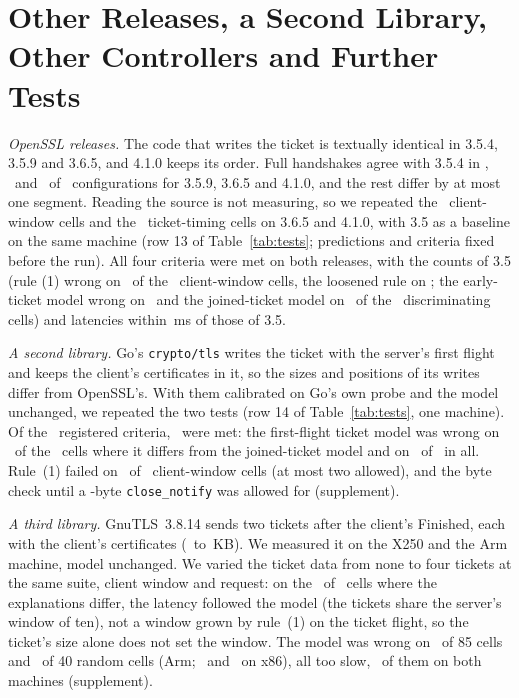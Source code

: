 \documentclass[sigconf,9pt,nonacm]{acmart}
\newcommand{\ms}{\,ms\xspace}
\begin{document}
\section{Other Releases, a Second Library, Other Controllers and Further Tests}\label{sec:other}
\emph{OpenSSL releases.} The code that writes the ticket is textually identical in 3.5.4, 3.5.9 and 3.6.5, and 4.1.0 keeps its order. Full handshakes agree with 3.5.4 in \OvTwoSame, \OvThreeSame\ and \OvFourSame\ of \OvTwoAll\ configurations for 3.5.9, 3.6.5 and 4.1.0, and the rest differ by at most one segment. Reading the source is not measuring, so we repeated the \CN\ client-window cells and the \DN\ ticket-timing cells on 3.6.5 and 4.1.0, with 3.5 as a baseline on the same machine (row 13 of Table~\ref{tab:tests}; predictions and criteria fixed before the run). All four criteria were met on both releases, with the counts of 3.5 (rule (1) wrong on \GxFourCWrong\ of the \CN\ client-window cells, the loosened rule on \GxFourCLoose; the early-ticket model wrong on \GxFourDisEarly\ and the joined-ticket model on \GxFourDisJoined\ of the \DDiff\ discriminating cells) and latencies within \GxMaxDiff\ms of those of 3.5.

\emph{A second library.} Go's \texttt{crypto/tls} writes the ticket with the server's first flight and keeps the client's certificates in it, so the sizes and positions of its writes differ from OpenSSL's. With them calibrated on Go's own probe and the model unchanged, we repeated the two tests (row 14 of Table~\ref{tab:tests}, one machine). Of the \GoKW\ registered criteria, \GoMet\ were met: the first-flight ticket model was wrong on \GoDisGoWrong\ of the \GoDisN\ cells where it differs from the joined-ticket model and on \GoWrongAll\ of \GoDN\ in all. Rule~(1) failed on \GoCWrong\ of \GoCN\ client-window cells (at most two allowed), and the byte check until a \GoClose-byte \texttt{close\_notify} was allowed for (supplement).

\emph{A third library.} GnuTLS~3.8.14 sends two tickets after the client's Finished, each with the client's certificates (\GtlsTicketMinKB\ to \GtlsTicketMaxKB\,KB). We measured it on the X250 and the Arm machine, model unchanged. We varied the ticket data from none to four tickets at the same suite, client window and request: on the \GtlsATInflight\ of \GtlsATN\ cells where the explanations differ, the latency followed the model (the tickets share the server's window of ten), not a window grown by rule~(1) on the ticket flight, so the ticket's size alone does not set the window. The model was wrong on \GtlsADWrong\ of 85 cells and \GtlsARWrong\ of 40 random cells (Arm; \GtlsXDWrong\ and \GtlsXRWrong\ on x86), all too slow, \GtlsSharedWrong\ of them on both machines (supplement).
\end{document}
